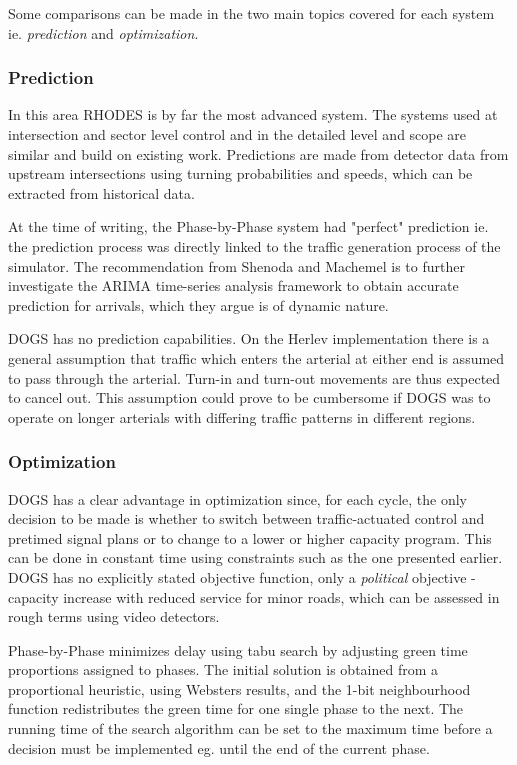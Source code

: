 Some comparisons can be made in the two main topics covered for each
system ie. \textit{prediction} and \textit{optimization}.

\subsubsection*{Prediction}

In this area RHODES is by far the most advanced system. The systems
used at intersection and sector level control and in the detailed
level and scope are similar and build on existing work. Predictions
are made from detector data from upstream intersections using turning
probabilities and speeds, which can be extracted from historical data.

At the time of writing, the Phase-by-Phase system had "perfect"
prediction ie. the prediction process was directly linked to the
traffic generation process of the simulator. The recommendation from
Shenoda and Machemel is to further investigate the ARIMA time-series
analysis framework to obtain accurate prediction for arrivals, which
they argue is of dynamic nature.

DOGS has no prediction capabilities. On the Herlev implementation
there is a general assumption that traffic which enters the arterial
at either end is assumed to pass through the arterial. Turn-in and
turn-out movements are thus expected to cancel out. This assumption
could prove to be cumbersome if DOGS was to operate on longer arterials
with differing traffic patterns in different regions.

\subsubsection*{Optimization}

DOGS has a clear advantage in optimization since, for each cycle, the
only decision to be made is whether to switch between traffic-actuated
control and pretimed signal plans or to change to a lower or higher
capacity program. This can be done in constant time using constraints
such as the one presented earlier. DOGS has no explicitly stated
objective function, only a \textit{political} objective - capacity
increase with reduced service for minor roads, which can be assessed
in rough terms using video detectors.

Phase-by-Phase minimizes delay using tabu search by adjusting green
time proportions assigned to phases. The initial solution is obtained
from a proportional heuristic, using Websters results, and the 1-bit
neighbourhood function redistributes the green time for one single
phase to the next.  The running time of the search algorithm can be
set to the maximum time before a decision must be implemented
eg. until the end of the current phase.

